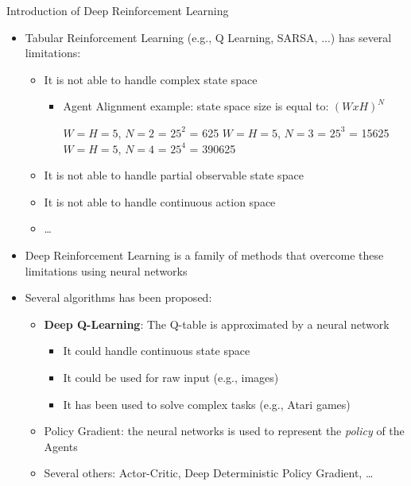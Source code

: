 \documentclass[presentation, 8pt]{beamer}\mode<presentation>{\usetheme{AMSBolognaFC}}
\begin{document}
\begin{frame}{Introduction of Deep Reinforcement Learning}
\begin{itemize}
	\item Tabular Reinforcement Learning (e.g., Q Learning, SARSA, ...) has several limitations:
	\begin{itemize}
		\item It is not able to handle complex state space 
		\begin{itemize}
			\item Agent Alignment example: state space size is equal to: $(WxH)^N$
			\begin{tasks}
				\task $W = H = 5$, $N = 2$ = $25^2$ = 625
				\task $W = H = 5$, $N = 3$ = $25^3$ = 15625
				\task $W = H = 5$, $N = 4$ = $25^4$ = 390625
			\end{tasks}
		\end{itemize}
		\item It is not able to handle partial observable state space
		\item It is not able to handle continuous action space
		\item \dots
	\end{itemize}
	\item Deep Reinforcement Learning is a family of methods that overcome these limitations using neural networks
	\item Several algorithms has been proposed:
	\begin{itemize}
		\item \textbf{Deep Q-Learning}: The Q-table is approximated by a neural network
		\begin{itemize}
			\item It could handle continuous state space
			\item It could be used for raw input (e.g., images)
			\item It has been used to solve complex tasks (e.g., Atari games)
		\end{itemize}
		\item Policy Gradient: the neural networks is used to represent the \emph{policy} of the Agents
		\item Several others: Actor-Critic, Deep Deterministic Policy Gradient, \dots
	\end{itemize}
\end{itemize}
\end{frame}
\end{document}
